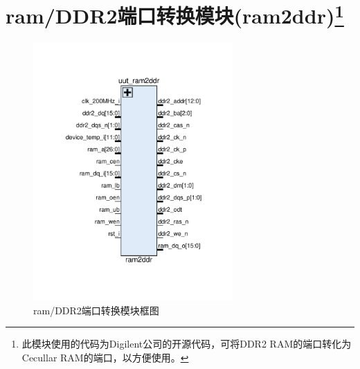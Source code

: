 \documentclass[forprint]{WHUBachelor}
\begin{document}
\section{ram/DDR2端口转换模块(ram2ddr)\protect\footnote{此模块使用的代码为Digilent公司的开源代码，可将DDR2 RAM的端口转化为Cecullar RAM的端口，以方便使用。}}

\begin{figure}[H]
  \centering
  \includegraphics[width=3in]{figures/ports/ram2ddr.pdf}
  \caption{ram/DDR2端口转换模块框图}
  \label{fig:ports:ram2ddr}
\end{figure}
\end{document}
